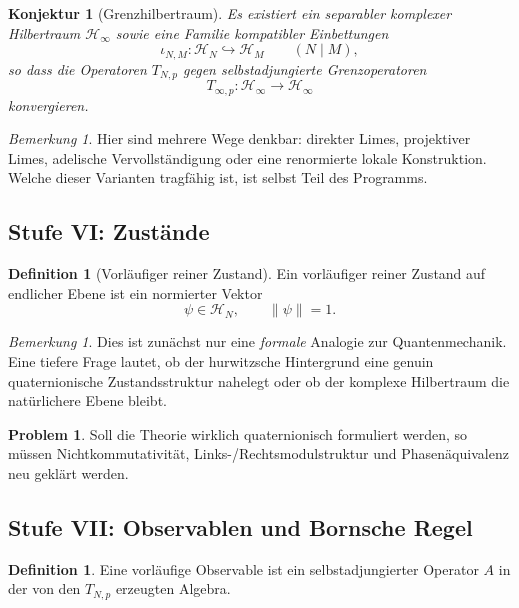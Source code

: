\documentclass[12pt,a4paper]{article}
\theoremstyle{plain}
\newtheorem{konjektur}[satz]{Konjektur}
\theoremstyle{definition}
\newtheorem{definition}[satz]{Definition}
\newtheorem{problem}[satz]{Problem}
\theoremstyle{remark}
\newtheorem{bemerkung}[satz]{Bemerkung}
\newcommand{\HN}{\mathcal H_N}
\newcommand{\Hinf}{\mathcal H_\infty}
\begin{document}
	\begin{konjektur}[Grenzhilbertraum]
		Es existiert ein separabler komplexer Hilbertraum \(\Hinf\) sowie eine Familie kompatibler
		Einbettungen
		\[
		\iota_{N,M}:\HN \hookrightarrow \mathcal H_M
		\qquad (N\mid M),
		\]
		so dass die Operatoren \(T_{N,p}\) gegen selbstadjungierte Grenzoperatoren
		\[
		T_{\infty,p}:\Hinf \to \Hinf
		\]
		konvergieren.
	\end{konjektur}
	
	\begin{bemerkung}
		Hier sind mehrere Wege denkbar: direkter Limes, projektiver Limes, adelische Vervollständigung
		oder eine renormierte lokale Konstruktion. Welche dieser Varianten tragfähig ist, ist
		selbst Teil des Programms.
	\end{bemerkung}
	
	\subsection{Stufe VI: Zustände}
	
	\begin{definition}[Vorläufiger reiner Zustand]
		Ein vorläufiger reiner Zustand auf endlicher Ebene ist ein normierter Vektor
		\[
		\psi\in\HN, \qquad \|\psi\|=1.
		\]
	\end{definition}
	
	\begin{bemerkung}
		Dies ist zunächst nur eine \emph{formale} Analogie zur Quantenmechanik. Eine tiefere
		Frage lautet, ob der hurwitzsche Hintergrund eine genuin quaternionische Zustandsstruktur
		nahelegt oder ob der komplexe Hilbertraum die natürlichere Ebene bleibt.
	\end{bemerkung}
	
	\begin{problem}
		Soll die Theorie wirklich quaternionisch formuliert werden, so müssen Nichtkommutativität,
		Links-/Rechtsmodulstruktur und Phasenäquivalenz neu geklärt werden.
	\end{problem}
	
	\subsection{Stufe VII: Observablen und Bornsche Regel}
	
	\begin{definition}
		Eine vorläufige Observable ist ein selbstadjungierter Operator \(A\) in der von den
		\(T_{N,p}\) erzeugten Algebra.
	\end{definition}
	
\end{document}
